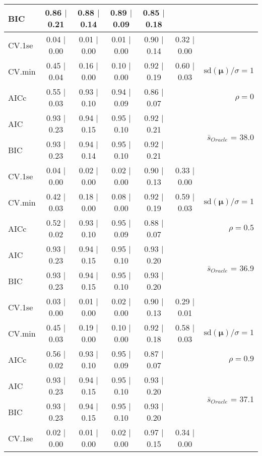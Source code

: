 \begin{table}
\begin{center}
\begin{tabular}{l*{5}{c}|r}
BIC & 0.86 $\mid$ 0.21 & 0.88 $\mid$ 0.14 & 0.89 $\mid$ 0.09 & 0.85 $\mid$ 0.18 & &  \\
 \hline 
CV.1se & 0.04 $\mid$ 0.00 & 0.01 $\mid$ 0.00 & 0.01 $\mid$ 0.00 & 0.90 $\mid$ 0.14 & 0.32 $\mid$ 0.00 & \\
CV.min & 0.45 $\mid$ 0.04 & 0.16 $\mid$ 0.00 & 0.10 $\mid$ 0.00 & 0.92 $\mid$ 0.19 & 0.60 $\mid$ 0.03 &  $\mathrm{sd}(\mathbf{\mu})/\sigma=1$ \\
AICc & 0.55 $\mid$ 0.03 & 0.93 $\mid$ 0.10 & 0.94 $\mid$ 0.09 & 0.86 $\mid$ 0.07 & & $\rho=0$ \\
AIC & 0.93 $\mid$ 0.23 & 0.94 $\mid$ 0.15 & 0.95 $\mid$ 0.10 & 0.92 $\mid$ 0.21 & &  \multirow{2}{*}{$\bar{s}_{Oracle}$ = 38.0} \\
BIC & 0.93 $\mid$ 0.23 & 0.94 $\mid$ 0.14 & 0.95 $\mid$ 0.10 & 0.92 $\mid$ 0.21 & &  \\
 \hline 
CV.1se & 0.04 $\mid$ 0.00 & 0.02 $\mid$ 0.00 & 0.02 $\mid$ 0.00 & 0.90 $\mid$ 0.13 & 0.33 $\mid$ 0.00 & \\
CV.min & 0.42 $\mid$ 0.03 & 0.18 $\mid$ 0.00 & 0.08 $\mid$ 0.00 & 0.92 $\mid$ 0.19 & 0.59 $\mid$ 0.03 &  $\mathrm{sd}(\mathbf{\mu})/\sigma=1$ \\
AICc & 0.52 $\mid$ 0.02 & 0.93 $\mid$ 0.10 & 0.95 $\mid$ 0.09 & 0.88 $\mid$ 0.07 & & $\rho=0.5$ \\
AIC & 0.93 $\mid$ 0.23 & 0.94 $\mid$ 0.15 & 0.95 $\mid$ 0.10 & 0.93 $\mid$ 0.20 & &  \multirow{2}{*}{$\bar{s}_{Oracle}$ = 36.9} \\
BIC & 0.93 $\mid$ 0.23 & 0.94 $\mid$ 0.15 & 0.95 $\mid$ 0.10 & 0.93 $\mid$ 0.20 & &  \\
 \hline 
CV.1se & 0.03 $\mid$ 0.00 & 0.01 $\mid$ 0.00 & 0.02 $\mid$ 0.00 & 0.90 $\mid$ 0.13 & 0.29 $\mid$ 0.01 & \\
CV.min & 0.45 $\mid$ 0.03 & 0.19 $\mid$ 0.00 & 0.10 $\mid$ 0.00 & 0.92 $\mid$ 0.18 & 0.58 $\mid$ 0.03 &  $\mathrm{sd}(\mathbf{\mu})/\sigma=1$ \\
AICc & 0.56 $\mid$ 0.02 & 0.93 $\mid$ 0.10 & 0.95 $\mid$ 0.09 & 0.87 $\mid$ 0.07 & & $\rho=0.9$ \\
AIC & 0.93 $\mid$ 0.23 & 0.94 $\mid$ 0.15 & 0.95 $\mid$ 0.10 & 0.93 $\mid$ 0.20 & &  \multirow{2}{*}{$\bar{s}_{Oracle}$ = 37.1} \\
BIC & 0.93 $\mid$ 0.23 & 0.94 $\mid$ 0.15 & 0.95 $\mid$ 0.10 & 0.93 $\mid$ 0.20 & &  \\
 \hline 
CV.1se & 0.02 $\mid$ 0.00 & 0.01 $\mid$ 0.00 & 0.02 $\mid$ 0.00 & 0.97 $\mid$ 0.15 & 0.34 $\mid$ 0.00 & \\

\end{tabular}
\end{center}
\end{table}
